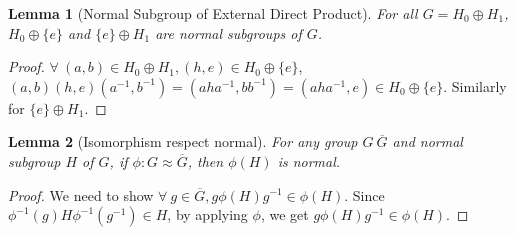\documentclass[14pt]{extarticle}
\newtheorem{lemma}{Lemma}[section]
\newcommand{\inv}[1]{#1^{-1}}
\begin{document}
\begin{lemma}[Normal Subgroup of External Direct Product]
  For all $G = H_0 \oplus H_1$, $H_0 \oplus \{ e \}$ and $\{ e \} \oplus H_1$
  are normal subgroups of $G$.
\end{lemma}
\begin{proof}
  $\forall \ (a , b) \in H_0 \oplus H_1, (h , e) \in H_0 \oplus \{ e \}$,
  $(a , b) (h , e) (\inv{a} , \inv{b}) = (a h \inv{a} , b \inv{b}) = (a h \inv{a} , e) \in H_0 \oplus \{ e \}$.
  Similarly for $\{ e \} \oplus H_1$.
\end{proof}

\begin{lemma}[Isomorphism respect normal]
  For any group $G \ \overline{G}$ and normal subgroup $H$ of $G$,
  if $\phi : G \approx \overline{G}$, then $\phi(H)$ is normal.
\end{lemma}
\begin{proof}
  We need to show $\forall \ g \in \overline{G}, g\phi(H)\inv{g} \in \phi(H)$.
  Since $\inv{\phi}(g)H\inv{\phi}(\inv{g}) \in H$, by applying $\phi$,
  we get $g\phi(H)\inv{g} \in \phi(H)$.
\end{proof}
\end{document}
